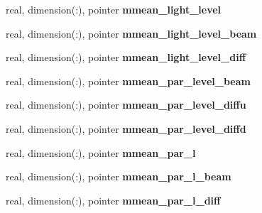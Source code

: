 \begin{DoxyCompactItemize}
\item 
\hypertarget{structed__state__vars_1_1patchtype_aa77778deaa21611a50a0db633d0d7e7a}{
real, dimension(:), pointer {\bfseries mmean\_\-light\_\-level}}
\label{structed__state__vars_1_1patchtype_aa77778deaa21611a50a0db633d0d7e7a}

\item 
\hypertarget{structed__state__vars_1_1patchtype_a4a29b274bd6ad11643e35c500a3ac2f5}{
real, dimension(:), pointer {\bfseries mmean\_\-light\_\-level\_\-beam}}
\label{structed__state__vars_1_1patchtype_a4a29b274bd6ad11643e35c500a3ac2f5}

\item 
\hypertarget{structed__state__vars_1_1patchtype_a30b7ae2d813ec9fe76e7ec84914ae3e5}{
real, dimension(:), pointer {\bfseries mmean\_\-light\_\-level\_\-diff}}
\label{structed__state__vars_1_1patchtype_a30b7ae2d813ec9fe76e7ec84914ae3e5}

\item 
\hypertarget{structed__state__vars_1_1patchtype_a4adeb47c699fb09475734ea166c480ff}{
real, dimension(:), pointer {\bfseries mmean\_\-par\_\-level\_\-beam}}
\label{structed__state__vars_1_1patchtype_a4adeb47c699fb09475734ea166c480ff}

\item 
\hypertarget{structed__state__vars_1_1patchtype_ac557cfc9df4fe69ac5a757af73464397}{
real, dimension(:), pointer {\bfseries mmean\_\-par\_\-level\_\-diffu}}
\label{structed__state__vars_1_1patchtype_ac557cfc9df4fe69ac5a757af73464397}

\item 
\hypertarget{structed__state__vars_1_1patchtype_a91c7f055b2fec5865d29c7de61043810}{
real, dimension(:), pointer {\bfseries mmean\_\-par\_\-level\_\-diffd}}
\label{structed__state__vars_1_1patchtype_a91c7f055b2fec5865d29c7de61043810}

\item 
\hypertarget{structed__state__vars_1_1patchtype_a032eac86140db9327302c8d73d601641}{
real, dimension(:), pointer {\bfseries mmean\_\-par\_\-l}}
\label{structed__state__vars_1_1patchtype_a032eac86140db9327302c8d73d601641}

\item 
\hypertarget{structed__state__vars_1_1patchtype_acb5e050b67529decf39ca464e124cfe9}{
real, dimension(:), pointer {\bfseries mmean\_\-par\_\-l\_\-beam}}
\label{structed__state__vars_1_1patchtype_acb5e050b67529decf39ca464e124cfe9}

\item 
\hypertarget{structed__state__vars_1_1patchtype_aeecbcfcb4b6be42ae1b34d82c6dc1b81}{
real, dimension(:), pointer {\bfseries mmean\_\-par\_\-l\_\-diff}}
\label{structed__state__vars_1_1patchtype_aeecbcfcb4b6be42ae1b34d82c6dc1b81}


\end{DoxyCompactItemize}
